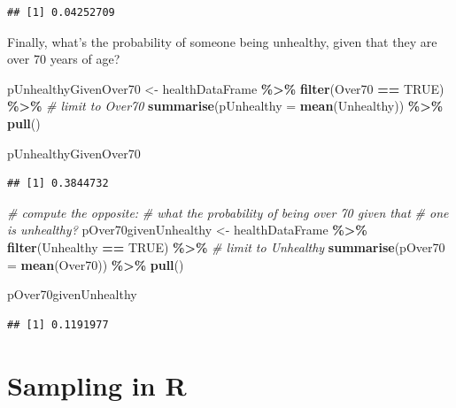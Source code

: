 \documentclass[
  12pt,
]{book}
\newenvironment{Shaded}{\begin{snugshade}}{\end{snugshade}}
\newcommand{\AttributeTok}[1]{\textcolor[rgb]{0.13,0.29,0.53}{#1}}
\newcommand{\CommentTok}[1]{\textcolor[rgb]{0.56,0.35,0.01}{\textit{#1}}}
\newcommand{\ConstantTok}[1]{\textcolor[rgb]{0.56,0.35,0.01}{#1}}
\newcommand{\FunctionTok}[1]{\textcolor[rgb]{0.13,0.29,0.53}{\textbf{#1}}}
\newcommand{\NormalTok}[1]{#1}
\newcommand{\OtherTok}[1]{\textcolor[rgb]{0.56,0.35,0.01}{#1}}
\newcommand{\SpecialCharTok}[1]{\textcolor[rgb]{0.81,0.36,0.00}{\textbf{#1}}}
\begin{document}
\begin{verbatim}
## [1] 0.04252709
\end{verbatim}

Finally, what's the probability of someone being unhealthy, given that they are over 70 years of age?

\begin{Shaded}
\begin{Highlighting}[]
\NormalTok{pUnhealthyGivenOver70 }\OtherTok{\textless{}{-}}
\NormalTok{  healthDataFrame }\SpecialCharTok{\%\textgreater{}\%}
  \FunctionTok{filter}\NormalTok{(Over70 }\SpecialCharTok{==} \ConstantTok{TRUE}\NormalTok{) }\SpecialCharTok{\%\textgreater{}\%} \CommentTok{\# limit to Over70}
  \FunctionTok{summarise}\NormalTok{(}\AttributeTok{pUnhealthy =} \FunctionTok{mean}\NormalTok{(Unhealthy)) }\SpecialCharTok{\%\textgreater{}\%} 
  \FunctionTok{pull}\NormalTok{()}

\NormalTok{pUnhealthyGivenOver70}
\end{Highlighting}
\end{Shaded}

\begin{verbatim}
## [1] 0.3844732
\end{verbatim}

\begin{Shaded}
\begin{Highlighting}[]
\CommentTok{\# compute the opposite:}
\CommentTok{\# what the probability of being over 70 given that }
\CommentTok{\# one is unhealthy?}
\NormalTok{pOver70givenUnhealthy }\OtherTok{\textless{}{-}}
\NormalTok{  healthDataFrame }\SpecialCharTok{\%\textgreater{}\%}
  \FunctionTok{filter}\NormalTok{(Unhealthy }\SpecialCharTok{==} \ConstantTok{TRUE}\NormalTok{) }\SpecialCharTok{\%\textgreater{}\%} \CommentTok{\# limit to Unhealthy}
  \FunctionTok{summarise}\NormalTok{(}\AttributeTok{pOver70 =} \FunctionTok{mean}\NormalTok{(Over70)) }\SpecialCharTok{\%\textgreater{}\%} 
  \FunctionTok{pull}\NormalTok{()}

\NormalTok{pOver70givenUnhealthy}
\end{Highlighting}
\end{Shaded}

\begin{verbatim}
## [1] 0.1191977
\end{verbatim}

\hypertarget{sampling-in-r}{%
\chapter{Sampling in R}\label{sampling-in-r}}
\end{document}
